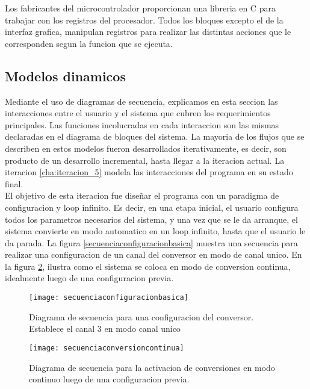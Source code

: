 
Los fabricantes del microcontrolador proporcionan una libreria en C para trabajar con los registros del procesador. Todos los bloques excepto el de la interfaz grafica, manipulan registros para realizar las distintas acciones que le corresponden segun la funcion que se ejecuta.  


\subsection{Modelos dinamicos} %
\label{sub:modelos_dinamicos}

Mediante el uso de diagramas de secuencia, explicamos en esta seccion las interacciones entre el usuario y el sistema que cubren los requerimientos principales. Las funciones incolucradas en cada interaccion son las mismas declaradas en el diagrama de bloques del sistema. La mayoria de los flujos que se describen en estos modelos fueron desarrollados iterativamente, es decir, son producto de un desarrollo incremental, hasta llegar a la iteracion actual. La iteracion \ref{cha:iteracion_5} modela las interacciones del programa en su estado final. \\

El objetivo de esta iteracion fue diseñar el programa con un paradigma de configuracion y loop infinito. Es decir, en una etapa inicial, el usuario configura todos los parametros necesarios del sistema, y una vez que se le da arranque, el sistema convierte en modo automatico en un loop infinito, hasta que el usuario le da parada. La figura \ref{secuenciaconfiguracionbasica} muestra una secuencia para realizar una configuracion de un canal del conversor en modo de canal unico. En la figura \ref{fig:secuenciaconversioncontinua}, ilustra como el sistema se coloca en modo de conversion continua, idealmente luego de una configuracion previa. 

\begin{figure}[h]
  \centering
  \texttt{[image: secuenciaconfiguracionbasica]}
  \caption{Diagrama de secuencia para una configuracion del conversor. Establece el canal 3 en modo canal unico}\label{fig:secuenciaconfiguracionbasica}
\end{figure}

\begin{figure}[h]
  \centering
  \texttt{[image: secuenciaconversioncontinua]}
  \caption{Diagrama de secuencia para la activacion de conversiones en modo continuo luego de una configuracion previa.}\label{fig:secuenciaconversioncontinua}
\end{figure}



